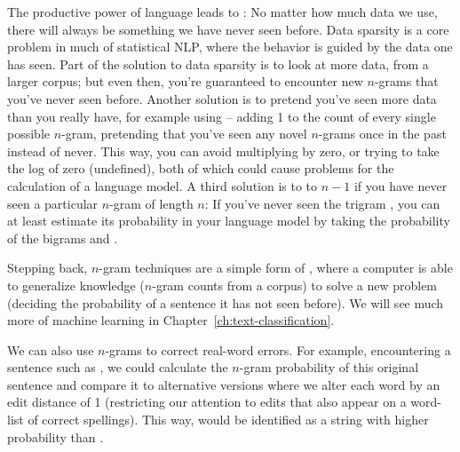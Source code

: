 The productive power of language leads to  : No matter how much data we use, there will always be something we have never seen before.
Data sparsity is a core problem in much of statistical NLP, where the behavior is guided by the data one has
seen.  Part of the solution to data sparsity is to look at more data, from a larger corpus; but even then, you're guaranteed to encounter new $n$-grams that you've never seen before.  Another solution is to pretend you've seen more data than you really have, for example using  -- adding 1 to the count of every single possible $n$-gram, pretending that you've seen any novel $n$-grams once in the past instead of never.  This way, you can avoid multiplying by zero, or trying to take the log of zero (undefined), both of which could cause problems for the calculation of a language model.  A third solution is to  to $n-1$ if you have never seen a particular $n$-gram of length $n$: If you've never seen  the trigram , you can at least estimate its probability in your language model by taking the probability of the bigrams  and . 

Stepping back, $n$-gram techniques are a simple form of , where a computer is able to generalize knowledge ($n$-gram counts from a corpus) to solve a new problem (deciding the probability of a sentence it has not seen before). We will see much more of machine learning in Chapter~\ref{ch:text-classification}.

We can also use $n$-grams to correct real-word errors.  For example, encountering a sentence such as , we could calculate the $n$-gram probability of this original sentence and compare it to alternative versions where we alter each word by an edit distance of 1 (restricting our attention to edits that also appear on a word-list of correct spellings).  This way,  would be identified as a string with higher probability than .




